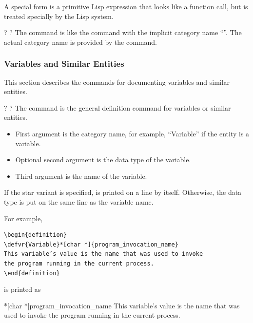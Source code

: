 \documentclass{scrartcl}
\begin{document}
{\begin{definition}
A special form is a primitive Lisp expression that looks like a
function call, but is treated specially by the Lisp system.
\end{definition}

\begin{definition}
 \code{*}\kleene? \kleene?  
The  command is like the  command with the
implicit category name “”.  The actual category name is
provided by the  command.
\end{definition}


\subsubsection{Variables and Similar Entities}

This section describes the commands for documenting variables and
similar entities.

\begin{definition}
  \code{*}\kleene? \kleene? 
The  command is the general definition command for
variables or similar entities.
\begin{itemize}
\item First argument  is the category name, for
example, “Variable” if the entity is a variable.
\item Optional second argument  is the data type of
the variable.
\item Third argument  is the name of the variable.
\end{itemize}
If the star variant is specified,  is printed on a
line by itself.  Otherwise, the data type is put on the same line as
the variable name.
\end{definition}

For example,
\begin{display}
\begin{verbatim}
\begin{definition}
\defvr{Variable}*[char *]{program_invocation_name}
This variable’s value is the name that was used to invoke
the program running in the current process.
\end{definition}
\end{verbatim}
\end{display}
is printed as
\begin{display}
\begin{definition}
*[char *]{program_invocation_name}
This variable’s value is the name that was used to invoke
the program running in the current process.
\end{definition}
\end{display}

}
\end{document}
